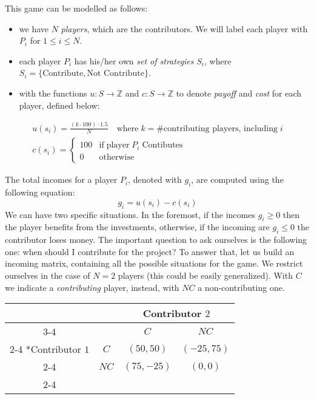 \documentclass{article}
\begin{document}
This game can be modelled as follows:
\begin{itemize}
    \item we have $N$ \textit{players}, which are the contributors. We will label each player with $P_i$ for $1 \le i \le N$.
    \item each player $P_i$ has his/her own \textit{set of strategies} $S_i$, where $S_i = \{\textrm{Contribute}, \textrm{Not Contribute}\}$.
    \item with the functions $u: S \to \mathbb{Z}$ and $c: S \to \mathbb{Z}$ to denote \textit{payoff} and \textit{cost} for each player, defined below:
\end{itemize}

\begin{gather*}
    u(s_i) = \frac{(k \cdot 100) \cdot 1.5}{N} \quad \textrm{where} \; k = \#\textrm{contributing players, including} \; i \\
    c(s_i) = \begin{cases}
        100 & \textrm{if} \; \textrm{player} \; P_i \; \textrm{Contibutes} \\
        0 & \textrm{otherwise}
    \end{cases}
\end{gather*}

\noindent The total incomes for a player $P_i$, denoted with $g_i$, are computed using the following equation:
\begin{equation*}
    g_i = u(s_i) - c(s_i)
\end{equation*}
We can have two specific situations. In the foremost, if the incomes $g_i \ge 0$ then the player benefits from the investments, otherwise, if the incoming
are $g_i \le 0$ the contributor loses money. The important question to ask ourselves is the following one: when should I contribute for the project?
To answer that, let us build an incoming matrix, containing all the possible situations for the game. We restrict ourselves in the case of $N=2$ players (this could be easily generalized).
With $C$ we indicate a \textit{contributing} player, instead, with $NC$ a non-contributing one.

\begin{table}[h!]
    \centering
    \setlength{\extrarowheight}{2pt}
    \begin{tabular}{*{4}{c|}}
      \multicolumn{2}{c}{} & \multicolumn{2}{c}{Contributor $2$}\\\cline{3-4}
      \multicolumn{1}{c}{} &  & $C$  & $NC$ \\\cline{2-4}
      \multirow{2}*{Contributor $1$}  & $C$ & $(50,50)$ & $(-25, 75)$ \\\cline{2-4}
      & $NC$ & $(75, -25)$ & $(0,0)$ \\\cline{2-4}
    \end{tabular}
    \label{Incoming table for $N=2$ players.}
\end{table}
\end{document}
